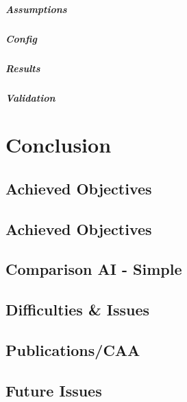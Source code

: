 \documentclass[11pt,oneside,a4paper,openright]{report}
\begin{document}
			\paragraph{Assumptions}
			\paragraph{Config}
			\paragraph{Results}
			\paragraph{Validation}


\newpage 
\chapter{Conclusion}
      \section{Achieved Objectives}
      \section{Achieved Objectives}
      \section{Comparison AI - Simple}
      \section{Difficulties \& Issues}
      \section{Publications/CAA}
      \section{Future Issues}
\newpage 

\end{document}
